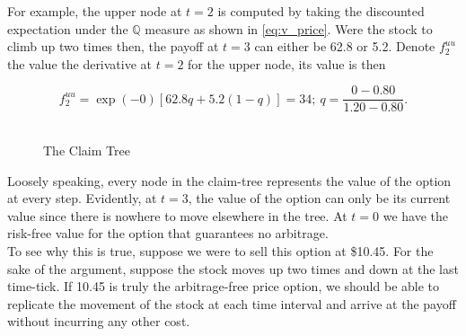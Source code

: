\documentclass[../TGMAFFIRO.tex]{subfiles}
\begin{document}
For example, the upper node at $t=2$ is computed by taking the discounted expectation under the $\mathbb{Q}$ measure as shown in \ref{eq:v_price}. Were the stock to climb up two times then, the payoff at $t=3$ can either be 62.8 or 5.2. Denote $f^{uu}_2$ the value the derivative at $t=2$ for the upper node, its value is then

\begin{equation*}
    f^{uu}_2 = \exp(-0)[62.8q + 5.2(1-q)] = 34; \  q = \frac{0 - 0.80}{1.20 - 0.80}.
\end{equation*}\\

\begin{figure}
\centering
{}
\caption{The Claim Tree}
\end{figure}

Loosely speaking, every node in the claim-tree represents the value of the option at every step. Evidently, at $t=3$, the value of the option can only be its current value since there is nowhere to move elsewhere in the tree. At $t=0$ we have the risk-free value for the option that guarantees no arbitrage.\\

To see why this is true, suppose we were to sell this option at \$10.45. For the sake of the argument, suppose the stock moves up two times and down at the last time-tick. If 10.45 is truly the arbitrage-free price option, we should be able to replicate the movement of the stock at each time interval and arrive at the payoff without incurring any other cost.\\
\end{document}
